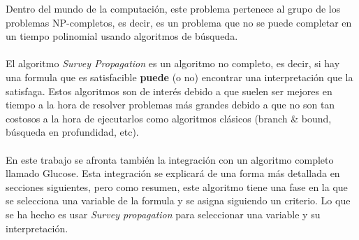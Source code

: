 Dentro del mundo de la computación, este problema pertenece al grupo de los problemas NP-completos, es decir, es un problema que no se puede completar en un tiempo polinomial usando algoritmos de búsqueda. \\\\
El algoritmo \textit{Survey Propagation} es un algoritmo no completo, es decir, si hay una formula que es satisfacible \textbf{puede} (o no) encontrar una interpretación que la satisfaga.
Estos algoritmos son de interés debido a que suelen ser mejores en tiempo a la hora de resolver problemas más grandes debido a que no son tan costosos a la hora de ejecutarlos como algoritmos clásicos (branch \& bound, búsqueda en profundidad, etc).\\\\
En este trabajo se afronta también la integración con un algoritmo completo llamado Glucose. Esta integración se explicará de una forma más detallada en secciones siguientes, pero como resumen, este algoritmo tiene una fase en la que se selecciona una variable de la formula y se asigna siguiendo un criterio. Lo que se ha hecho es usar \textit{Survey propagation} para seleccionar una variable y su interpretación.